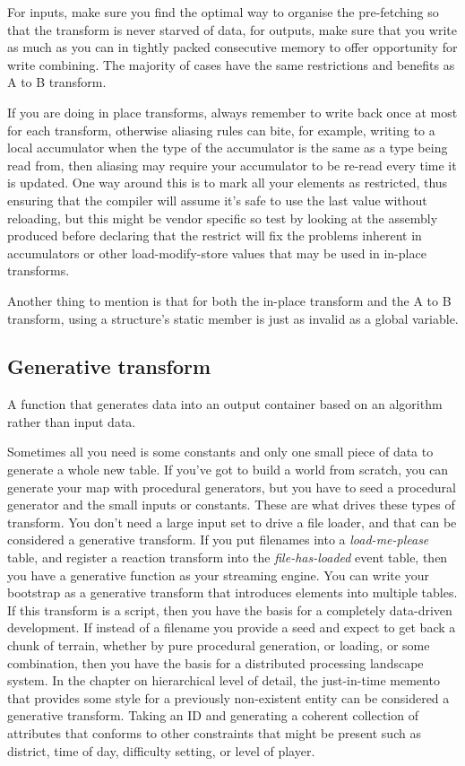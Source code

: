 For inputs, make sure you find the optimal way to organise the pre-fetching so
that the transform is never starved of data, for outputs, make sure that you
write as much as you can in tightly packed consecutive memory to offer
opportunity for write combining. The majority of cases have the same restrictions
and benefits as A to B transform.

If you are doing in place transforms, always remember to write back once at
most for each transform, otherwise aliasing rules can bite, for example,
writing to a local accumulator when the type of the accumulator is the same as
a type being read from, then aliasing may require your accumulator to be
re-read every time it is updated. One way around this is to mark all your
elements as restricted, thus ensuring that the compiler will assume it's safe
to use the last value without reloading, but this might be vendor specific so
test by looking at the assembly produced before declaring that the restrict
will fix the problems inherent in accumulators or other load-modify-store
values that may be used in in-place transforms.

Another thing to mention is that for both the in-place transform and the A to B
transform, using a structure's static member is just as invalid as a global
variable.

\subsection{Generative transform}

A function that generates data into an output container based on an algorithm
rather than input data.

Sometimes all you need is some constants and only one small piece of data to
generate a whole new table. If you've got to build a world from scratch, you
can generate your map with procedural generators, but you have to seed a
procedural generator and the small inputs or constants. These are what drives
these types of transform. You don't need a large input set to drive a file
loader, and that can be considered a generative transform. If you put filenames
into a \emph{load-me-please} table, and register a reaction transform into the
\emph{file-has-loaded} event table, then you have a generative function as your
streaming engine. You can write your bootstrap as a generative transform that
introduces elements into multiple tables. If this transform is a script, then
you have the basis for a completely data-driven development. If instead of a
filename you provide a seed and expect to get back a chunk of terrain, whether
by pure procedural generation, or loading, or some combination, then you have
the basis for a distributed processing landscape system. In the chapter on
hierarchical level of detail, the just-in-time memento that provides some style
for a previously non-existent entity can be considered a generative transform.
Taking an ID and generating a coherent collection of attributes that conforms
to other constraints that might be present such as district, time of day,
difficulty setting, or level of player.

